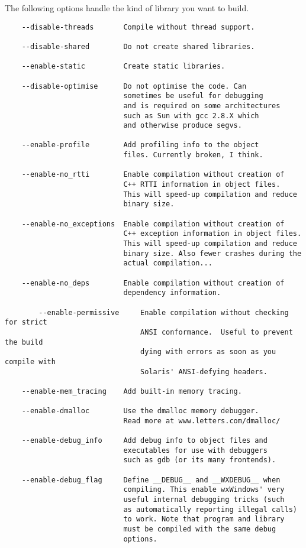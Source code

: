 The following options handle the kind of library you want to build.

\begin{verbatim}
	--disable-threads       Compile without thread support.

	--disable-shared        Do not create shared libraries.

	--enable-static         Create static libraries.

	--disable-optimise	    Do not optimise the code. Can
	                        sometimes be useful for debugging
                            and is required on some architectures
                            such as Sun with gcc 2.8.X which
                            and otherwise produce segvs.

	--enable-profile        Add profiling info to the object 
				            files. Currently broken, I think.
				
	--enable-no_rtti        Enable compilation without creation of
	                        C++ RTTI information in object files. 
                            This will speed-up compilation and reduce 
                            binary size.
				
	--enable-no_exceptions  Enable compilation without creation of
	                        C++ exception information in object files. 
                            This will speed-up compilation and reduce 
                            binary size. Also fewer crashes during the
                            actual compilation...
				
	--enable-no_deps        Enable compilation without creation of
	                        dependency information.
				
        --enable-permissive     Enable compilation without checking for strict
                                ANSI conformance.  Useful to prevent the build
                                dying with errors as soon as you compile with
                                Solaris' ANSI-defying headers.
				
	--enable-mem_tracing    Add built-in memory tracing.
				
	--enable-dmalloc        Use the dmalloc memory debugger.
	                        Read more at www.letters.com/dmalloc/
				
	--enable-debug_info	    Add debug info to object files and
	                        executables for use with debuggers
				            such as gdb (or its many frontends).

	--enable-debug_flag	    Define __DEBUG__ and __WXDEBUG__ when
	                        compiling. This enable wxWindows' very
                            useful internal debugging tricks (such
                            as automatically reporting illegal calls)
                            to work. Note that program and library
                            must be compiled with the same debug 
                            options.
\end{verbatim}

